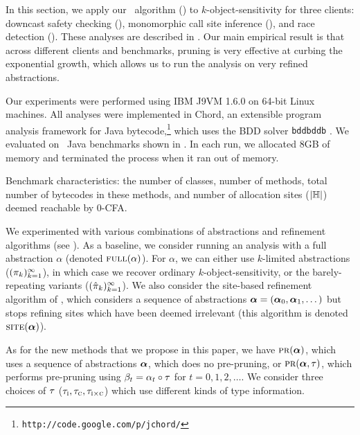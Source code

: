 
In this section, we apply our \PR\ algorithm () to
$k$-object-sensitivity for three clients:
downcast safety checking (\downcast),
monomorphic call site inference (\monosite),
and race detection (\race).  These analyses are described in .
Our main empirical result is that across different clients and benchmarks,
pruning is very effective at curbing the exponential growth,
which allows us to run the analysis on very refined abstractions.


Our experiments were performed using IBM J9VM 1.6.0 on 64-bit Linux machines.
All analyses were implemented in Chord,
an extensible program analysis framework for Java bytecode,\footnote{{\tt{http://code.google.com/p/jchord/}}}
which uses the BDD solver {\tt bddbddb} \cite{Whaley2007}.
We evaluated on \numBenchmarks\ Java benchmarks shown in .
In each run, we allocated 8GB of memory and terminated the process when it ran out of memory.

\begin{table*}
\centering

\caption{Benchmark characteristics:
the number of classes,
number of methods,
total number of bytecodes in these methods,
and number of allocation sites ($|{\mathbb H}|$)
deemed reachable by 0-CFA.
\label{tab:benchmarks}}
\end{table*}

We experimented with various combinations of abstractions and refinement
algorithms (see ).  As a baseline, we consider running an analysis
with a full abstraction $\alpha$ (denoted $\text{\sc full}(\alpha)$).
For $\alpha$, we can either use $k$-limited abstractions
($(\pi_k)_{k=1}^\infty$), in which case we recover ordinary $k$-object-sensitivity,
or the barely-repeating variants ($(\hat{\pi}_k)_{k=1}^\infty$).
We also consider the site-based refinement algorithm of \cite{liang11minimal},
which considers a sequence of abstractions $\mbox{\boldmath$\alpha$} = (\mbox{\boldmath$\alpha$}_0, \mbox{\boldmath$\alpha$}_1, \dots)$
but stops refining sites which have been deemed irrelevant (this algorithm is denoted $\text{\sc site}(\mbox{\boldmath$\alpha$})$).

As for the new methods that we propose in this paper,
we have $\text{\sc pr}(\mbox{\boldmath$\alpha$})$, which uses a sequence of abstractions $\mbox{\boldmath$\alpha$}$, which does no pre-pruning,
or $\text{\sc pr}(\mbox{\boldmath$\alpha$},\tau)$, which performs pre-pruning using $\beta_t = \alpha_t
\circ \tau$ for $t = 0, 1, 2, \dots$.  We consider three choices of $\tau$
($\tau_{\text{\sc i}},\tau_{\text{\sc c}},\tau_{\text{\sc i} \times \text{\sc c}}$) which use different kinds of type information.

